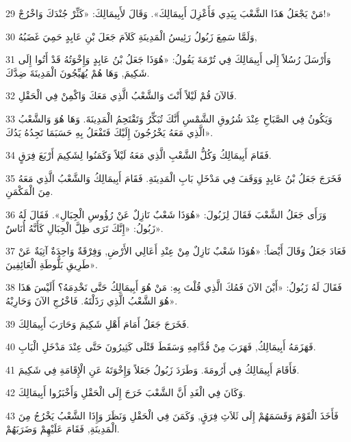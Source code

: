 \par 29 مَنْ يَجْعَلُ هَذَا الشَّعْبَ بِيَدِي فَأَعْزِلَ أَبِيمَالِكَ». وَقَالَ لأَبِيمَالِكَ: «كَثِّرْ جُنْدَكَ وَاخْرُجْ!»
\par 30 وَلَمَّا سَمِعَ زَبُولُ رَئِيسُ الْمَدِينَةِ كَلاَمَ جَعَلَ بْنِ عَابِدٍ حَمِيَ غَضَبُهُ,
\par 31 وَأَرْسَلَ رُسُلاً إِلَى أَبِيمَالِكَ فِي تُرْمَةَ يَقُولُ: «هُوَذَا جَعَلُ بْنُ عَابِدٍ وَإِخْوَتُهُ قَدْ أَتُوا إِلَى شَكِيمَ, وَهَا هُمْ يُهَيِّجُونَ الْمَدِينَةَ ضِدَّكَ.
\par 32 فَالآنَ قُمْ لَيْلاً أَنْتَ وَالشَّعْبُ الَّذِي مَعَكَ وَاكْمِنْ فِي الْحَقْلِ.
\par 33 وَيَكُونُ فِي الصَّبَاحِ عِنْدَ شُرُوقِ الشَّمْسِ أَنَّكَ تُبَكِّرُ وَتَقْتَحِمُ الْمَدِينَةَ. وَهَا هُوَ وَالشَّعْبُ الَّذِي مَعَهُ يَخْرُجُونَ إِلَيْكَ فَتَفْعَلُ بِهِ حَسَبَمَا تَجِدُهُ يَدُكَ».
\par 34 فَقَامَ أَبِيمَالِكُ وَكُلُّ الشَّعْبِ الَّذِي مَعَهُ لَيْلاً وَكَمَنُوا لِشَكِيمَ أَرْبَعَ فِرَقٍ.
\par 35 فَخَرَجَ جَعَلُ بْنُ عَابِدٍ وَوَقَفَ فِي مَدْخَلِ بَابِ الْمَدِينَةِ. فَقَامَ أَبِيمَالِكُ وَالشَّعْبُ الَّذِي مَعَهُ مِنَ الْمَكْمَنِ.
\par 36 وَرَأَى جَعَلُ الشَّعْبَ فَقَالَ لِزَبُولَ: «هُوَذَا شَعْبٌ نَازِلٌ عَنْ رُؤُوسِ الْجِبَالِ». فَقَالَ لَهُ زَبُولُ: «إِنَّكَ تَرَى ظِلَّ الْجِبَالِ كَأَنَّهُ أُنَاسٌ».
\par 37 فَعَادَ جَعَلُ وَقَالَ أَيْضاً: «هُوَذَا شَعْبٌ نَازِلٌ مِنْ عِنْدِ أَعَالِي الأَرْضِ, وَفِرْقَةٌ وَاحِدَةٌ آتِيَةٌ عَنْ طَرِيقِ بَلُّوطَةِ الْعَائِفِينَ».
\par 38 فَقَالَ لَهُ زَبُولُ: «أَيْنَ الآنَ فَمُكَ الَّذِي قُلْتَ بِهِ: مَنْ هُوَ أَبِيمَالِكُ حَتَّى نَخْدِمَهُ؟ أَلَيْسَ هَذَا هُوَ الشَّعْبُ الَّذِي رَذَلْتَهُ. فَاخْرُجِ الآنَ وَحَارِبْهُ».
\par 39 فَخَرَجَ جَعَلُ أَمَامَ أَهْلِ شَكِيمَ وَحَارَبَ أَبِيمَالِكَ.
\par 40 فَهَزَمَهُ أَبِيمَالِكُ, فَهَرَبَ مِنْ قُدَّامِهِ وَسَقَطَ قَتْلَى كَثِيرُونَ حَتَّى عِنْدَ مَدْخَلِ الْبَابِ.
\par 41 فَأَقَامَ أَبِيمَالِكُ فِي أَرُومَةَ. وَطَرَدَ زَبُولُ جَعَلاً وَإِخْوَتَهُ عَنِ الْإِقَامَةِ فِي شَكِيمَ.
\par 42 وَكَانَ فِي الْغَدِ أَنَّ الشَّعْبَ خَرَجَ إِلَى الْحَقْلِ وَأَخْبَرُوا أَبِيمَالِكَ.
\par 43 فَأَخَذَ الْقَوْمَ وَقَسَمَهُمْ إِلَى ثَلاَثِ فِرَقٍ, وَكَمَنَ فِي الْحَقْلِ وَنَظَرَ وَإِذَا الشَّعْبُ يَخْرُجُ مِنَ الْمَدِينَةِ, فَقَامَ عَلَيْهِمْ وَضَرَبَهُمْ.
